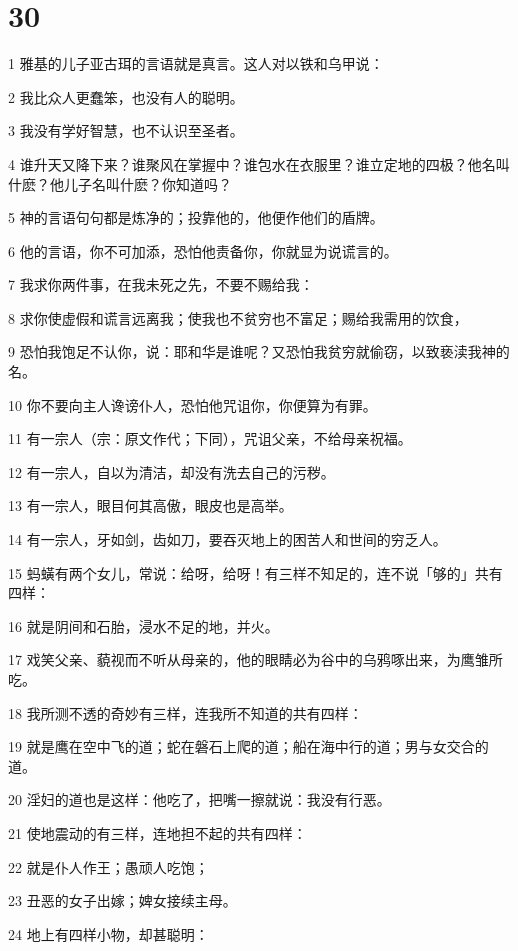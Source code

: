 \chapter{30}

\par 1 雅基的儿子亚古珥的言语就是真言。这人对以铁和乌甲说：
\par 2 我比众人更蠢笨，也没有人的聪明。
\par 3 我没有学好智慧，也不认识至圣者。
\par 4 谁升天又降下来？谁聚风在掌握中？谁包水在衣服里？谁立定地的四极？他名叫什麽？他儿子名叫什麽？你知道吗？
\par 5 神的言语句句都是炼净的；投靠他的，他便作他们的盾牌。
\par 6 他的言语，你不可加添，恐怕他责备你，你就显为说谎言的。
\par 7 我求你两件事，在我未死之先，不要不赐给我：
\par 8 求你使虚假和谎言远离我；使我也不贫穷也不富足；赐给我需用的饮食，
\par 9 恐怕我饱足不认你，说：耶和华是谁呢？又恐怕我贫穷就偷窃，以致亵渎我神的名。
\par 10 你不要向主人谗谤仆人，恐怕他咒诅你，你便算为有罪。
\par 11 有一宗人（宗：原文作代；下同），咒诅父亲，不给母亲祝福。
\par 12 有一宗人，自以为清洁，却没有洗去自己的污秽。
\par 13 有一宗人，眼目何其高傲，眼皮也是高举。
\par 14 有一宗人，牙如剑，齿如刀，要吞灭地上的困苦人和世间的穷乏人。
\par 15 蚂蟥有两个女儿，常说：给呀，给呀！有三样不知足的，连不说「够的」共有四样：
\par 16 就是阴间和石胎，浸水不足的地，并火。
\par 17 戏笑父亲、藐视而不听从母亲的，他的眼睛必为谷中的乌鸦啄出来，为鹰雏所吃。
\par 18 我所测不透的奇妙有三样，连我所不知道的共有四样：
\par 19 就是鹰在空中飞的道；蛇在磐石上爬的道；船在海中行的道；男与女交合的道。
\par 20 淫妇的道也是这样：他吃了，把嘴一擦就说：我没有行恶。
\par 21 使地震动的有三样，连地担不起的共有四样：
\par 22 就是仆人作王；愚顽人吃饱；
\par 23 丑恶的女子出嫁；婢女接续主母。
\par 24 地上有四样小物，却甚聪明：
